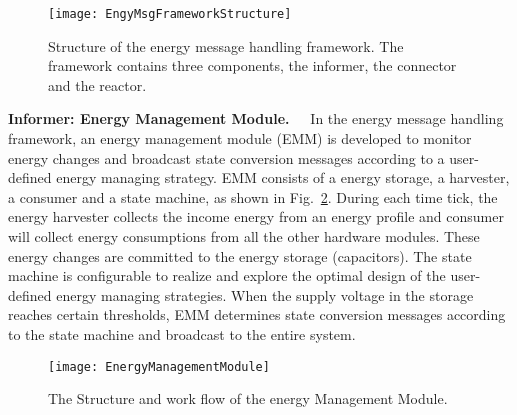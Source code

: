 \begin{figure}[!htpb]
	\centering
	\texttt{[image: EngyMsgFrameworkStructure]}
	\vspace{-5pt}
	\caption{Structure of the energy message handling framework. The framework contains three components, the informer, the connector and the reactor.}		\label{fig:EngyMsgFrameworkStructure}
\end{figure}

\textbf{Informer: Energy Management Module.\ \ }
In the energy message handling framework, an energy management module (EMM) is developed to monitor energy changes and broadcast state conversion messages according to a user-defined energy managing strategy.
EMM consists of a energy storage, a harvester, a consumer and a state machine, as shown in Fig.~\ref{fig:EnergyManagementModule}. 
During each time tick, the energy harvester collects the income energy from an energy profile and consumer will collect energy consumptions from all the other hardware modules. 
These energy changes are committed to the energy storage (capacitors). 
The state machine is configurable to realize and explore the optimal design of the user-defined energy managing strategies. 
When the supply voltage in the storage reaches certain thresholds, EMM determines state conversion messages according to the state machine and broadcast to the entire system.

\begin{figure}[!htpb]
	\centering
	\vspace{-5pt}
	\texttt{[image: EnergyManagementModule]}
	\vspace{-10pt}
	\caption{The Structure and work flow of the energy Management Module.}		\label{fig:EnergyManagementModule}
\end{figure}

